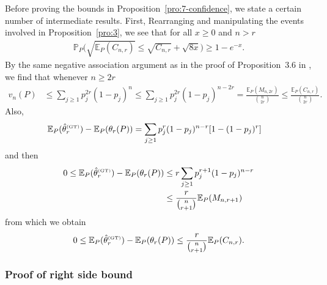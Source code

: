 \documentclass{article}
\newcommand{\1}{\boldsymbol{1}}
\newcommand{\EE}{\mathbb{E}}
\newcommand{\PP}{\mathbb{P}}
\theoremstyle{plain}
\begin{document}
Before proving the bounds in Proposition~\ref{pro:7-confidence}, we state a certain number of intermediate results. First, Rearranging and manipulating the events involved in Proposition~\ref{pro:3}, we see that for all $x \geq 0$ and $n > r$
\begin{gather}
  \label{eq:30}
  \PP_P\Big(\sqrt{\EE_P(C_{n,r})} \leq \sqrt{C_{n,r}} + \sqrt{8x} \Big) \geq 1 - e^{-x}.
\end{gather}
By the same negative association argument as in the proof of Proposition~3.6 in \cite{Ben(17)}, we find that whenever $n \geq 2r$
\begin{align}
  \label{eq:42}
  v_n(P)%
  &\leq \sum_{j\geq 1}p_j^{2r}(1 - p_j)^n%
  \leq \sum_{j\geq 1}p_j^{2r}(1 - p_j)^{n-2r}%
    = \frac{\EE_P(M_{n,2r})}{\binom{n}{2r}}%
    \leq \frac{\EE_P(C_{n,r})}{\binom{n}{2r}}.
\end{align}
Also,
\begin{align*}
  \EE_P(\hat{\theta}_r^{\text{\tiny{(GT)}}}) -  \EE_P(\theta_r(P))%
  &= \sum_{j\geq 1}p_j^r(1-p_j)^{n-r}[1 - (1-p_j)^r]
\end{align*}
and then
\begin{align*}
  0 \leq%
  \EE_P(\hat{\theta}_r^{\text{\tiny{(GT)}}}) -  \EE_P(\theta_r(P))
  &\leq r\sum_{j\geq 1}p_j^{r+1}(1-p_j)^{n-r}\\
  &\leq \frac{r}{\binom{n}{r+1}}\EE_P(M_{n,r+1})
\end{align*}
from which we obtain
\begin{align}
  \label{eq:40}
  0%
  \leq \EE_P(\hat{\theta}_r^{\text{\tiny{(GT)}}}) - \EE_P(\theta_r(P))%
  \leq \frac{r}{\binom{n}{r+1}}\EE_P(C_{n,r}).
\end{align}


\subsubsection{Proof of right side bound}
\end{document}
